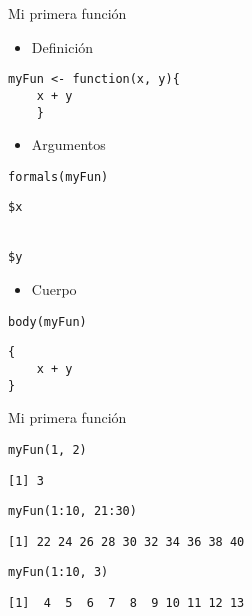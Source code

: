 \documentclass[xcolor={usenames,svgnames,dvipsnames}]{beamer}
\begin{document}
\begin{frame}[fragile,label=sec-1-3]{Mi primera función}
 \begin{itemize}
\item Definición
\end{itemize}
\lstset{language=R,numbers=none}
\begin{lstlisting}
myFun <- function(x, y){
    x + y
    }
\end{lstlisting}

\begin{itemize}
\item Argumentos
\end{itemize}
\lstset{language=R,numbers=none}
\begin{lstlisting}
formals(myFun)
\end{lstlisting}

\begin{verbatim}
$x


$y
\end{verbatim}

\begin{itemize}
\item Cuerpo
\end{itemize}
\lstset{language=R,numbers=none}
\begin{lstlisting}
body(myFun)
\end{lstlisting}

\begin{verbatim}
{
    x + y
}
\end{verbatim}
\end{frame}
\begin{frame}[fragile,label=sec-1-4]{Mi primera función}
 \lstset{language=R,numbers=none}
\begin{lstlisting}
myFun(1, 2)
\end{lstlisting}

\begin{verbatim}
[1] 3
\end{verbatim}

\lstset{language=R,numbers=none}
\begin{lstlisting}
myFun(1:10, 21:30)
\end{lstlisting}

\begin{verbatim}
[1] 22 24 26 28 30 32 34 36 38 40
\end{verbatim}

\lstset{language=R,numbers=none}
\begin{lstlisting}
myFun(1:10, 3)
\end{lstlisting}

\begin{verbatim}
[1]  4  5  6  7  8  9 10 11 12 13
\end{verbatim}
\end{frame}
\end{document}
